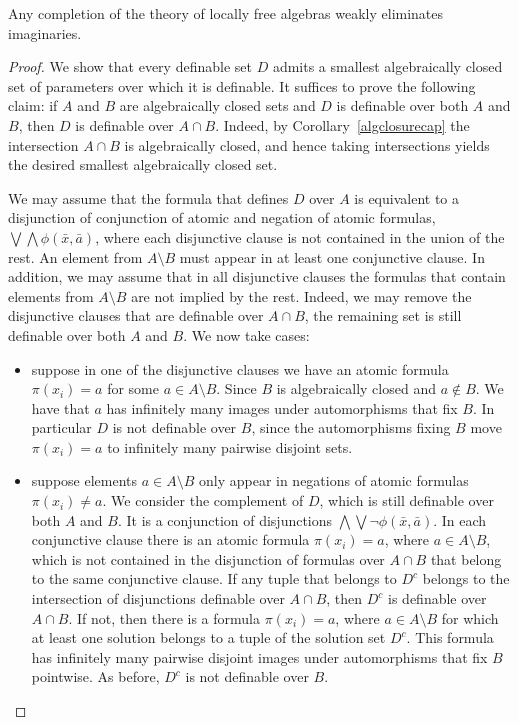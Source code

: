 \documentclass[a4paper,11pt]{article}
\begin{document}
\begin{theorem}\label{WEI}
Any completion of the theory of locally free algebras weakly eliminates imaginaries.
\end{theorem}

\begin{proof}
We show that every definable set $D$ admits a smallest algebraically closed set of parameters over which it is definable. It suffices to prove the following claim: if $A$ and $B$ are algebraically closed sets and $D$ is definable over both $A$ and $B$, then $D$ is definable over $A\cap B$. Indeed, by Corollary~\ref{algclosurecap} the intersection $A\cap B$ is algebraically closed, and hence taking intersections yields the desired smallest algebraically closed set. 

We may assume that the formula that defines $D$ over $A$ is equivalent to a disjunction of conjunction of atomic and negation of atomic formulas, $\bigvee\bigwedge \phi(\bar x, \bar a)$, where each disjunctive clause is not contained in the union of the rest. An element from $A\setminus B$ must appear in at least one conjunctive clause. In addition, we may assume that in all disjunctive clauses the formulas that contain elements from $A\setminus B$ are not implied by the rest. Indeed, we may remove the disjunctive clauses that are definable over $A\cap B$, the remaining set is still definable over both $A$ and $B$.
We now take cases: 
\begin{itemize}

\item suppose in one of the disjunctive clauses we have an atomic formula $\pi(x_i)=a$ for some $a\in A\setminus B$. Since $B$ is algebraically closed and $a\notin B$. We have that $a$ has infinitely many images under automorphisms that fix $B$. In particular $D$ is not definable over $B$, since the automorphisms fixing $B$ move $\pi(x_i)=a$ to infinitely many pairwise disjoint sets.  

\item suppose elements $a\in A\setminus B$ only appear in negations of atomic formulas $\pi(x_i)\neq a$. We consider the complement of $D$, which is still definable over both $A$ and $B$. It is a conjunction of disjunctions $\bigwedge\bigvee \lnot\phi(\bar x, \bar a)$. In each conjunctive clause there is an atomic formula $\pi(x_i)=a$, where $a\in A\setminus B$, which is not contained in the disjunction of formulas over $A\cap B$ that belong to the same conjunctive clause. If any tuple that belongs to $D^{c}$ belongs to the intersection of disjunctions definable over $A\cap B$, then $D^{c}$ is definable over $A\cap B$. If not, then there is a formula $\pi(x_i)=a$, where $a\in A\setminus B$ for which at least one solution belongs to a tuple of the solution set $D^{c}$. This formula has infinitely many pairwise disjoint images under automorphisms that fix $B$ pointwise. As before, $D^{c}$ is not definable over $B$.     

\end{itemize}




\end{proof}
\end{document}
